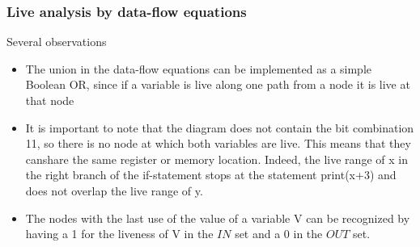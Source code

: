 \documentclass[presentation]{beamer}
\begin{document}
\begin{frame}
  \frametitle{Live analysis by data-flow equations}
  \begin{block}{Several observations}
\begin{itemize}
    \item The union in the data-flow equations can be implemented as a simple Boolean OR, since if a variable is live along one path from a node it is live at that node
    \item  It is important to note that the diagram does not contain the bit combination 11, so there is no node at which both variables are live. This means that they canshare the same register or memory location. Indeed, the live range of x in the right branch of the if-statement stops at the statement print(x+3) and does not overlap the live range of y.
    \item  The nodes with the last use of the value of a variable V can be recognized by having a 1 for the liveness of V in the $IN$ set and a 0 in the $OUT$ set.
\end{itemize}
  \end{block}
\end{frame}
\end{document}
